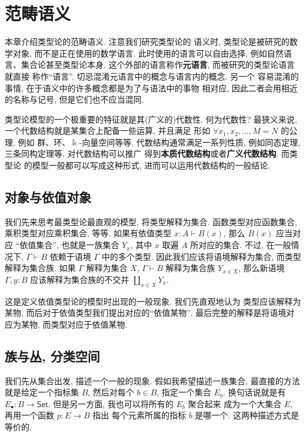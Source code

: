 \chapter{范畴语义}

本章介绍类型论的范畴语义. 注意我们研究类型论的
语义时, 类型论是被研究的数学对象, 而不是正在使用的数学语言.
此时使用的语言可以自由选择, 例如自然语言、集合论甚至类型论本身.
这个外部的语言称作\textbf{元语言}, 而被研究的类型论语言就直接
称作“语言”. 切忌混淆元语言中的概念与语言内的概念. 另一个
容易混淆的事情, 在于语义中的许多概念都是为了与语法中的事物
相对应, 因此二者会用相近的名称与记号, 但是它们也不应当混同.

类型论模型的一个极重要的特征就是其(广义的)代数性. 何为代数性?
最狭义来说, 一个代数结构就是某集合上配备一些运算, 并且满足
形如 \(\forall x_1, x_2, \dots, M = N\) 的公理. 例如
群、环、\(\Bbbk\)-向量空间等等. 代数结构通常满足一系列性质,
例如同态定理, 三条同构定理等. 对代数结构可以推广
得到\textbf{本质代数结构}或者\textbf{广义代数结构}. 而类型论
的模型一般都可以写成这种形式, 进而可以运用代数结构的一般结论.

\section{对象与依值对象}

我们先来思考最类型论最直观的模型, 将类型解释为集合.
函数类型对应函数集合, 乘积类型对应乘积集合, 等等.
如果有依值类型 \(x{:}A \vdash B(x)\), 那么 \(B(x)\)
应当对应 “依值集合”, 也就是一族集合 \(Y_x\), 其中 \(x\)
取遍 \(A\) 所对应的集合.
不过, 在一般情况下, \(\Gamma \vdash B\) 依赖于语境
\(\Gamma\) 中的多个类型. 因此我们应该将语境解释为集合,
而类型解释为集合族. 如果 \(\Gamma\) 解释为集合 \(X\),
\(\Gamma \vdash B\) 解释为集合族 \(Y_{x \in X}\),
那么新语境 \(\Gamma, y{:}B\) 应该解释为集合族的不交并
\(\coprod_{x \in X} Y_x\).

这是定义依值类型论的模型时出现的一般现象. 我们先直观地认为
类型应该解释为某物, 而后对于依值类型我们提出对应的“依值某物”,
最后完整的解释是将语境对应为某物, 而类型对应于依值某物.

\section{族与丛, 分类空间}

我们先从集合出发, 描述一个一般的现象.
假如我希望描述一族集合, 最直接的方法就是给定一个指标集 \(B\),
然后对每个 \(b \in B\), 指定一个集合 \(E_b\).
换句话说就是有 \(E_\bullet : B \to \mathsf{Set}\).
但是另一方面, 我也可以将所有的 \(E_b\) 聚合起来
成为一个大集合 \(E\), 再用一个函数 \(p : E \to B\) 指出
每个元素所属的指标 \(b\) 是哪一个. 这两种描述方式是等价的.

